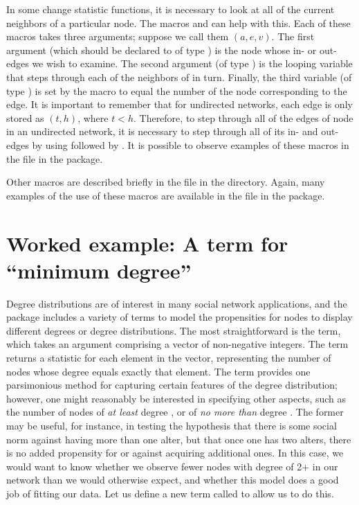 \documentclass[nojss]{jss}
\begin{document}
In some change statistic functions, it is necessary to look at all of the current
neighbors of a particular node.  The macros
 and 
can help with this.  Each of these macros takes three arguments; suppose
we call them $(a, e, v)$.  The first argument (which should be declared to of type ) is the node whose in- or out-edges
we wish to examine.  The second argument (of type ) is the looping
variable that steps through each of the neighbors of  in turn.  Finally,
the third variable (of type ) is set by the macro to equal the number of
the node corresponding to the edge.  It is important to remember that for undirected
networks, each edge is only stored as $(t,h)$, where $t<h$.
Therefore, to step
through all of the edges of node  in an undirected network, it is necessary
to step through all of its in- and out-edges by using
followed by
.  It is possible to observe
examples of these macros in the  file in the
 package.

Other macros are described briefly in the file  in the 
directory.  Again, many examples of the use of these macros are available in the
 file in the  package.


\section{Worked example: A term for ``minimum degree''}
\label{Example}

Degree distributions are of interest in many social network applications, and the  package
includes a variety of terms to model the propensities for nodes to display different degrees or degree distributions.  The most straightforward is the  term, which takes an argument comprising a vector of non-negative integers. The term returns a statistic for each element in the vector, representing the number of nodes whose degree equals exactly that element.  The  term provides one parsimonious method for capturing certain features of the degree distribution; however, one might reasonably be interested in specifying other aspects, such as the number of nodes of {\em at least} degree , or of {\em no more than} degree . The former may be useful, for instance, in testing the hypothesis that there is some social norm against having more than one alter, but that once one has two alters, there is no added propensity for or against acquiring additional ones. In this case, we would want to know whether we observe fewer nodes with degree of 2+ in our network than we would otherwise expect, and whether this model does a good job of fitting our data.  Let us define a new  term called  to allow us to do this.
\end{document}
